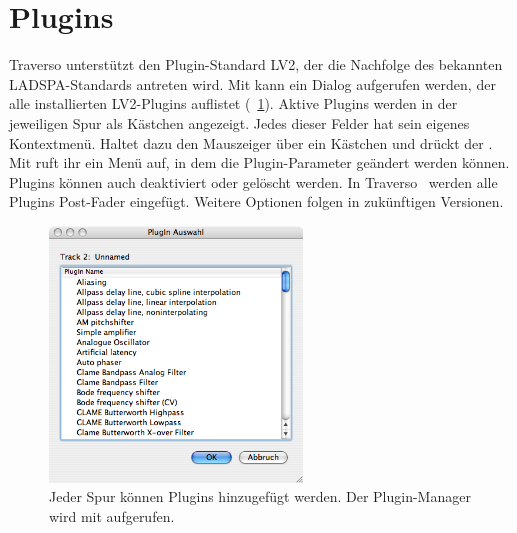 \section{Plugins}
Traverso unterstützt den Plugin-Standard LV2, der die Nachfolge des bekannten LADSPA-Standards antreten wird. Mit  kann ein Dialog aufgerufen werden, der alle installierten LV2-Plugins auflistet (\FigB~\ref{fig_pluglist}). Aktive Plugins werden in der jeweiligen Spur als Kästchen angezeigt. Jedes dieser Felder hat sein eigenes Kontextmenü. Haltet dazu den Mauszeiger über ein Kästchen und drückt  der . Mit  ruft ihr ein Menü auf, in dem die Plugin-Parameter geändert werden können. Plugins können auch deaktiviert  oder gelöscht  werden. In Traverso \Version\ werden alle Plugins Post-Fader eingefügt. Weitere Optionen folgen in zukünftigen Versionen.

\begin{figure}[t]
 \centering\includegraphics[width=0.6\textwidth]{images/plugin-list}
 \caption{Jeder Spur können Plugins hinzugefügt werden. Der Plugin-Manager wird mit  aufgerufen.}
 \label{fig_pluglist}
\end{figure}


